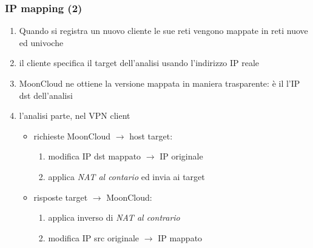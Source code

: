 \begin{frame}
	\frametitle{IP mapping (2)}
	\begin{enumerate}
		\item Quando si registra un nuovo cliente le sue reti vengono \alert{mappate}
		      in reti nuove ed univoche
		      		      
		\item il cliente specifica il target dell'analisi usando l'indirizzo IP reale
		      		              
		\item MoonCloud ne ottiene la \alert{versione mappata} in maniera
		      \alert{trasparente}: è il l'IP dst dell'analisi
		      		      
		\item l'analisi parte, nel \alert{VPN client}
		      \begin{itemize}
		      	\item richieste MoonCloud $\rightarrow$ host target:
		      	      \begin{enumerate}
		      	      	\item modifica IP dst mappato $\rightarrow$ IP originale
		      	      	\item applica \textit{NAT al contario} ed invia ai target
		      	      \end{enumerate}
		      	\item risposte target $\rightarrow$ MoonCloud:
		      	      \begin{enumerate}
		      	      	\item applica inverso di \textit{NAT al contrario}
		      	      	\item modifica IP src originale $\rightarrow$ IP mappato
		      	      \end{enumerate}
		      \end{itemize}
		      		      
	\end{enumerate}
		
\end{frame}

